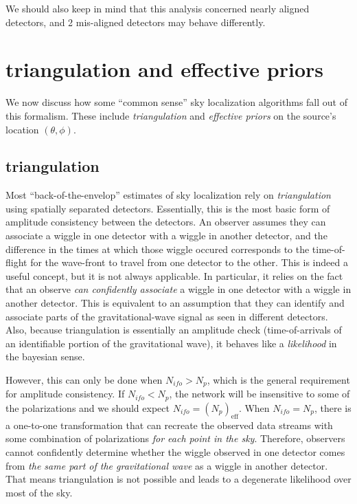 \documentclass[10pt]{article}
\begin{document}
We should also keep in mind that this analysis concerned nearly aligned detectors, and 2 mis-aligned detectors may behave differently.

\section{triangulation and effective priors}

We now discuss how some ``common sense'' sky localization algorithms fall out of this formalism. These include \emph{triangulation} and \emph{effective priors} on the source's location $(\theta,\phi)$.

\subsection{triangulation}
Most ``back-of-the-envelop'' estimates of sky localization rely on \emph{triangulation} using spatially separated detectors. Essentially, this is the most basic form of amplitude consistency between the detectors. An observer assumes they can associate a wiggle in one detector with a wiggle in another detector, and the difference in the times at which those wiggle occured corresponds to the time-of-flight for the wave-front to travel from one detector to the other. This is indeed a useful concept, but it is not always applicable. In particular, it relies on the fact that an observe \emph{can confidently associate} a wiggle in one detector with a wiggle in another detector. This is equivalent to an assumption that they can identify and associate parts of the gravitational-wave signal as seen in different detectors. Also, because triangulation is essentially an amplitude check (time-of-arrivals of an identifiable portion of the gravitational wave), it behaves like a \emph{likelihood} in the bayesian sense.

However, this can only be done when $N_{ifo} > N_{p}$, which is the general requirement for amplitude consistency. If $N_{ifo} < N_p$, the network will be insensitive to some of the polarizations and we should expect $N_{ifo} = \left(N_p\right)_{\mathrm{eff}}$. When $N_{ifo} = N_p$, there is a one-to-one transformation that can recreate the observed data streams with some combination of polarizations \emph{for each point in the sky}. Therefore, observers cannot confidently determine whether the wiggle observed in one detector comes from \emph{the same part of the gravitational wave} as a wiggle in another detector. That means triangulation is not possible and leads to a degenerate likelihood over most of the sky.
\end{document}
